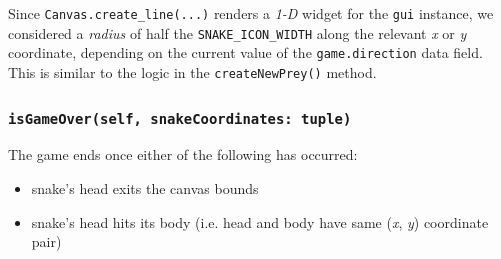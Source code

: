 \documentclass{article}
\begin{document}
Since \texttt{Canvas.create\_line(...)} renders a \textit{1-D} widget
for the \texttt{gui} instance, we considered a \textit{radius} of half the \texttt{SNAKE\_ICON\_WIDTH} along the relevant \textit{x} or \textit{y} coordinate, depending on the current value of
the \texttt{game.direction} data field. This is similar to the logic in the \texttt{createNewPrey()} method.

\subsubsection{\texttt{isGameOver(self, snakeCoordinates: tuple)}}\label{sec:Game_Over}
The game ends once either of the following has occurred:
\begin{itemize}
    \item snake's head exits the canvas bounds
    \item snake's head hits its body (i.e. head and body have same (\textit{x}, \textit{y}) coordinate pair)
\end{itemize}
\end{document}
